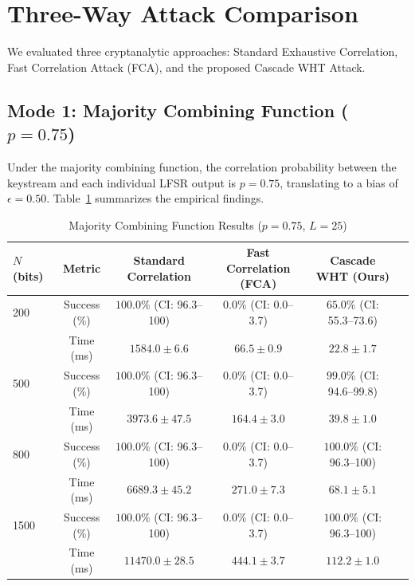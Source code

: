 \section{Three-Way Attack Comparison}
\label{sec:three_way_comparison}

We evaluated three cryptanalytic approaches: Standard Exhaustive Correlation, Fast Correlation Attack (FCA), and the proposed Cascade WHT Attack.

\subsection{Mode 1: Majority Combining Function ($p = 0.75$)}
Under the majority combining function, the correlation probability between the keystream and each individual LFSR output is $p = 0.75$, translating to a bias of $\epsilon = 0.50$. Table~\ref{tab:majority_results} summarizes the empirical findings.

\begin{table}[h]
\centering
\caption{Majority Combining Function Results ($p = 0.75$, $L=25$)}
\label{tab:majority_results}
\begin{tabular}{@{}lccccc@{}}
\toprule
\textbf{$N$ (bits)} & \textbf{Metric} & \textbf{Standard Correlation} & \textbf{Fast Correlation (FCA)} & \textbf{Cascade WHT (Ours)} \\ \midrule
200 & Success (\%) & $100.0\%$ (CI: 96.3--100) & $0.0\%$ (CI: 0.0--3.7) & $65.0\%$ (CI: 55.3--73.6) \\
    & Time (ms)    & $1584.0 \pm 6.6$ & $66.5 \pm 0.9$ & $\mathbf{22.8 \pm 1.7}$ \\ \midrule
500 & Success (\%) & $100.0\%$ (CI: 96.3--100) & $0.0\%$ (CI: 0.0--3.7) & $99.0\%$ (CI: 94.6--99.8) \\
    & Time (ms)    & $3973.6 \pm 47.5$ & $164.4 \pm 3.0$ & $\mathbf{39.8 \pm 1.0}$ \\ \midrule
800 & Success (\%) & $100.0\%$ (CI: 96.3--100) & $0.0\%$ (CI: 0.0--3.7) & $100.0\%$ (CI: 96.3--100) \\
    & Time (ms)    & $6689.3 \pm 45.2$ & $271.0 \pm 7.3$ & $\mathbf{68.1 \pm 5.1}$ \\ \midrule
1500& Success (\%) & $100.0\%$ (CI: 96.3--100) & $0.0\%$ (CI: 0.0--3.7) & $100.0\%$ (CI: 96.3--100) \\
    & Time (ms)    & $11470.0 \pm 28.5$ & $444.1 \pm 3.7$ & $\mathbf{112.2 \pm 1.0}$ \\ \bottomrule
\end{tabular}
\end{table}

